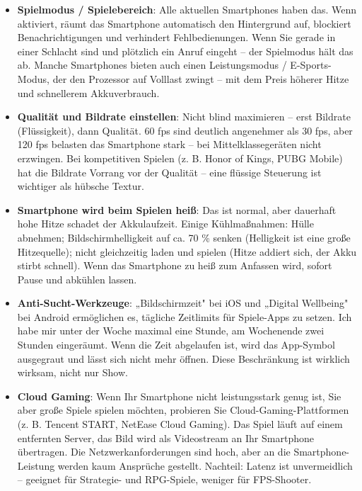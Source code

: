 \begin{itemize}
  \item \textbf{Spielmodus / Spielebereich}: Alle aktuellen Smartphones haben das. Wenn aktiviert, räumt das Smartphone automatisch den Hintergrund auf, blockiert Benachrichtigungen und verhindert Fehlbedienungen. Wenn Sie gerade in einer Schlacht sind und plötzlich ein Anruf eingeht – der Spielmodus hält das ab. Manche Smartphones bieten auch einen Leistungsmodus / E-Sports-Modus, der den Prozessor auf Volllast zwingt – mit dem Preis höherer Hitze und schnellerem Akkuverbrauch.
  \item \textbf{Qualität und Bildrate einstellen}: Nicht blind maximieren – erst Bildrate (Flüssigkeit), dann Qualität. 60 fps sind deutlich angenehmer als 30 fps, aber 120 fps belasten das Smartphone stark – bei Mittelklassegeräten nicht erzwingen. Bei kompetitiven Spielen (z. B. Honor of Kings, PUBG Mobile) hat die Bildrate Vorrang vor der Qualität – eine flüssige Steuerung ist wichtiger als hübsche Textur.
  \item \textbf{Smartphone wird beim Spielen heiß}: Das ist normal, aber dauerhaft hohe Hitze schadet der Akkulaufzeit. Einige Kühlmaßnahmen: Hülle abnehmen; Bildschirmhelligkeit auf ca. 70 \% senken (Helligkeit ist eine große Hitzequelle); nicht gleichzeitig laden und spielen (Hitze addiert sich, der Akku stirbt schnell). Wenn das Smartphone zu heiß zum Anfassen wird, sofort Pause und abkühlen lassen.
  \item \textbf{Anti-Sucht-Werkzeuge}: „Bildschirmzeit" bei iOS und „Digital Wellbeing" bei Android ermöglichen es, tägliche Zeitlimits für Spiele-Apps zu setzen. Ich habe mir unter der Woche maximal eine Stunde, am Wochenende zwei Stunden eingeräumt. Wenn die Zeit abgelaufen ist, wird das App-Symbol ausgegraut und lässt sich nicht mehr öffnen. Diese Beschränkung ist wirklich wirksam, nicht nur Show.
  \item \textbf{Cloud Gaming}: Wenn Ihr Smartphone nicht leistungsstark genug ist, Sie aber große Spiele spielen möchten, probieren Sie Cloud-Gaming-Plattformen (z. B. Tencent START, NetEase Cloud Gaming). Das Spiel läuft auf einem entfernten Server, das Bild wird als Videostream an Ihr Smartphone übertragen. Die Netzwerkanforderungen sind hoch, aber an die Smartphone-Leistung werden kaum Ansprüche gestellt. Nachteil: Latenz ist unvermeidlich – geeignet für Strategie- und RPG-Spiele, weniger für FPS-Shooter.
\end{itemize}

